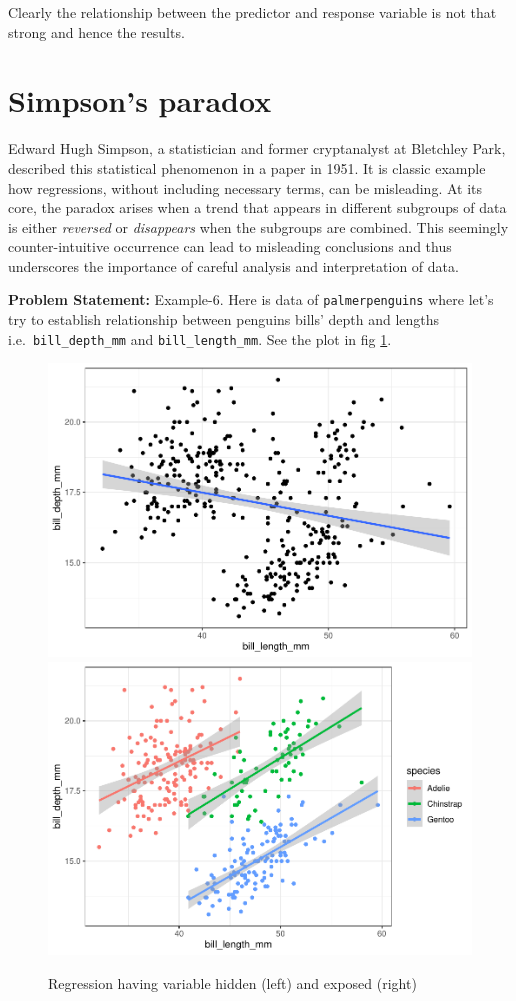 \documentclass[
]{book}
\begin{document}
Clearly the relationship between the predictor and response variable is not that strong and hence the results.

\hypertarget{simpsons-paradox}{%
\section{Simpson's paradox}\label{simpsons-paradox}}

Edward Hugh Simpson, a statistician and former cryptanalyst at Bletchley Park, described this statistical phenomenon in a paper in 1951. It is classic example how regressions, without including necessary terms, can be misleading. At its core, the paradox arises when a trend that appears in different subgroups of data is either \emph{reversed} or \emph{disappears} when the subgroups are combined. This seemingly counter-intuitive occurrence can lead to misleading conclusions and thus underscores the importance of careful analysis and interpretation of data.

\textbf{Problem Statement:} Example-6. Here is data of \texttt{palmerpenguins} where let's try to establish relationship between penguins bills' depth and lengths i.e.~\texttt{bill\_depth\_mm} and \texttt{bill\_length\_mm}. See the plot in fig \ref{fig:ex3}.

\begin{figure}

{\centering \includegraphics[width=0.47\linewidth]{DauR_files/figure-latex/ex3-1} \includegraphics[width=0.47\linewidth]{DauR_files/figure-latex/ex3-2} 

}

\caption{Regression having variable hidden (left) and exposed (right)}\label{fig:ex3}
\end{figure}
\end{document}
